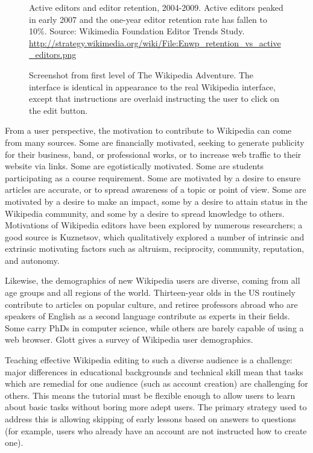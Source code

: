 \documentclass{acm_proc_article-sp}
\begin{document}
\begin{figure}
\centering
{}
\caption{Active editors and editor retention, 2004-2009. Active editors peaked in early 2007 and the one-year editor retention rate has fallen to 10\%. Source: Wikimedia Foundation Editor Trends Study.  
\url{http://strategy.wikimedia.org/wiki/File:Enwp_retention_vs_active_editors.png}}
\label{fig:retention}
\end{figure}

\begin{figure*}
\centering
{}
\caption{Screenshot from first level of The Wikipedia Adventure. The interface is identical in appearance to the real Wikipedia interface, except that instructions are overlaid instructing the user to click on the edit button. }
\label{fig:screenshot}
\end{figure*}

From a user perspective, the motivation to contribute to Wikipedia can come from many sources. Some are financially motivated, seeking to generate publicity for their business, band, or professional works, or to increase web traffic to their website via links. Some are egotistically motivated. Some are students participating as a course requirement. Some are motivated by a desire to ensure articles are accurate, or to spread awareness of a topic or point of view. Some are motivated by a desire to make an impact, some by a desire to attain status in the Wikipedia community, and some by a desire to spread knowledge to others. Motivations of Wikipedia editors have been explored by numerous researchers; a good source is Kuznetsov,\cite{Kuznetsov:2006} which qualitatively explored a number of intrinsic and extrinsic motivating factors such as altruism, reciprocity, community, reputation, and autonomy.

Likewise, the demographics of new Wikipedia users are diverse, coming from all age groups and all regions of the world. Thirteen-year olds in the US routinely contribute to articles on popular culture, and retiree professors abroad who are speakers of English as a second language contribute as experts in their fields. Some carry PhDs in computer science, while others are barely capable of using a web browser. Glott\cite{Glott:2010} gives a survey of Wikipedia user demographics.

Teaching effective Wikipedia editing to such a diverse audience is a challenge: major differences in educational backgrounds and technical skill mean that tasks which are remedial for one audience (such as account creation) are challenging for others. This means the tutorial must be flexible enough to allow users to learn about basic tasks without boring more adept users. The primary strategy used to address this is allowing skipping of early lessons based on answers to questions (for example, users who already have an account are not instructed how to create one).
\end{document}
